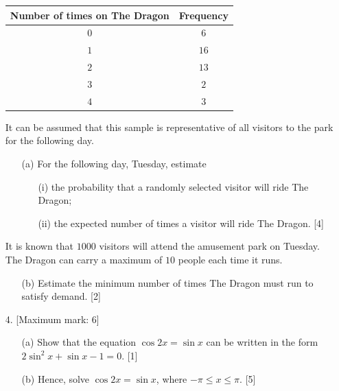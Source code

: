 \documentclass[12pt, twoside]{article}
\begin{document}
\begin{enumerate}[itemsep=0.2cm]
\renewcommand{\arraystretch}{1.35}
\begin{center}
\begin{tabular}{|c|c|}
\hline
\textbf{Number of times on The Dragon} & \textbf{Frequency} \\
\hline
$0$ & $6$ \\
$1$ & $16$ \\
$2$ & $13$ \\
$3$ & $2$ \\
$4$ & $3$ \\
\hline
\end{tabular}
\end{center}
\renewcommand{\arraystretch}{1.0}

It can be assumed that this sample is representative of all visitors to the park for the following day.

\begin{enumerate}[itemsep=0.1cm]
    \item[(a)] For the following day, Tuesday, estimate
    \begin{enumerate}[itemsep=0.1cm]
        \item[(i)] the probability that a randomly selected visitor will ride The Dragon;
        \item[(ii)] the expected number of times a visitor will ride The Dragon. \hfill [4]
    \end{enumerate}
\end{enumerate}

It is known that $1000$ visitors will attend the amusement park on Tuesday. The Dragon can carry a maximum of $10$ people each time it runs.

\begin{enumerate}[itemsep=0.1cm]
    \item[(b)] Estimate the minimum number of times The Dragon must run to satisfy demand. \hfill [2]
\end{enumerate}

\newpage

\item[4.] [Maximum mark: 6]

\begin{enumerate}[itemsep=0.1cm]
    \item[(a)] Show that the equation $\cos 2x = \sin x$ can be written in the form $2\sin^2 x + \sin x - 1 = 0$. \hfill [1]
    \item[(b)] Hence, solve $\cos 2x = \sin x$, where $-\pi \leq x \leq \pi$. \hfill [5]
\end{enumerate}


\end{enumerate}
\end{document}
